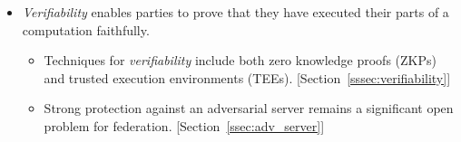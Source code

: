\begin{itemize}
\begin{itemize}
    \end{itemize}
    \item {\em Verifiability} enables parties to prove that they have executed their parts of a computation faithfully.
    \begin{itemize}
        \item Techniques for {\em verifiability} include both zero knowledge proofs (ZKPs) and trusted execution environments (TEEs).  [Section~\ref{sssec:verifiability}]
        \item Strong protection against an adversarial server remains a significant open problem for federation. [Section~\ref{ssec:adv_server}]
    \end{itemize}
\end{itemize}